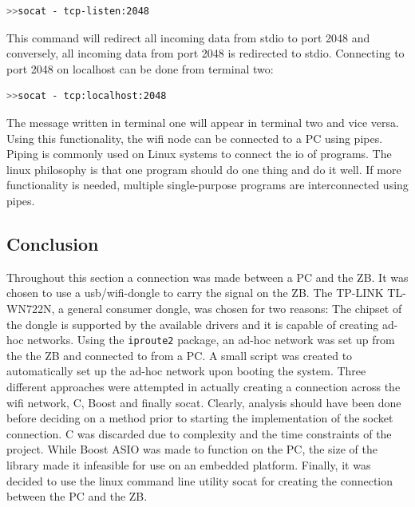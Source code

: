 \begin{lstlisting}[language=bash]
>>socat - tcp-listen:2048
\end{lstlisting}

This command will redirect all incoming data from stdio to port 2048 and conversely, all incoming data from port 2048 is redirected to stdio. 
Connecting to port 2048 on localhost can be done from terminal two:

\begin{lstlisting}[language=bash]
>>socat - tcp:localhost:2048
\end{lstlisting}

The message written in terminal one will appear in terminal two and vice versa.
Using this functionality, the wifi node can be connected to a PC using pipes.
Piping is commonly used on Linux systems to connect the io of programs.
The linux philosophy is that one program should do one thing and do it well.
If more functionality is needed, multiple single-purpose programs are interconnected using pipes.

\subsection{Conclusion}

Throughout this section a connection was made between a PC and the ZB.
It was chosen to use a usb/wifi-dongle to carry the signal on the ZB.
The TP-LINK TL-WN722N, a general consumer dongle, was chosen for two reasons: The chipset of the dongle is supported by the available drivers and it is capable of creating ad-hoc networks.
Using the \texttt{iproute2} package, an ad-hoc network was set up from the the ZB and connected to from a PC.
A small script was created to automatically set up the ad-hoc network upon booting the system.
Three different approaches were attempted in actually creating a connection across the wifi network, C, Boost and finally socat.
Clearly, analysis should have been done before deciding on a method prior to starting the implementation of the socket connection.
C was discarded due to complexity and the time constraints of the project.
While Boost ASIO was made to function on the PC, the size of the library made it infeasible for use on an embedded platform.
Finally, it was decided to use the linux command line utility socat for creating the connection between the PC and the ZB.